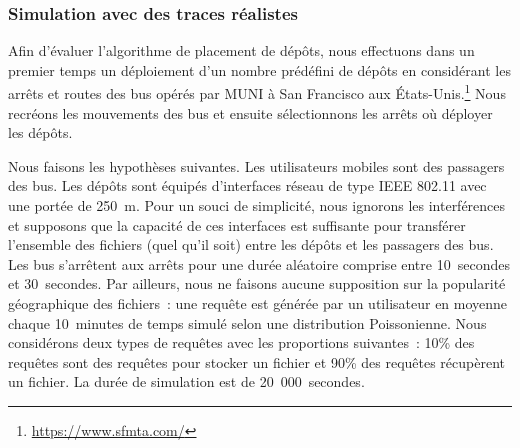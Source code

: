  
\subsubsection{Simulation avec des traces réalistes} 
\label{sec:simulation-traces-reelles-fr} 
 
 
Afin d’évaluer l’algorithme de placement de dépôts, nous effectuons dans un premier temps un déploiement d’un nombre prédéfini de dépôts en considérant les arrêts et routes des bus opérés par MUNI à San Francisco aux États-Unis.\footnote{\url{https://www.sfmta.com/}} Nous recréons les mouvements des bus et ensuite sélectionnons les arrêts où déployer les dépôts. 
 
 
Nous faisons les hypothèses suivantes. Les utilisateurs mobiles sont des passagers des bus. Les dépôts sont équipés d’interfaces réseau de type IEEE 802.11 avec une portée de 250~m. Pour un souci de simplicité, nous ignorons les interférences et supposons que la capacité de ces interfaces est suffisante pour transférer l’ensemble des fichiers (quel qu’il soit) entre les dépôts et les passagers des bus. Les bus s’arrêtent aux arrêts pour une durée aléatoire comprise entre 10~secondes et 30~secondes. Par ailleurs, nous ne faisons aucune supposition sur la popularité géographique des fichiers~: une requête est générée par un utilisateur  en moyenne chaque 10~minutes de temps simulé selon une distribution Poissonienne. Nous considérons deux types de requêtes avec les proportions suivantes~: 10\% des requêtes sont des requêtes pour stocker un fichier et 90\% des requêtes récupèrent un fichier. La durée de simulation est de 20~000~secondes. 
 
